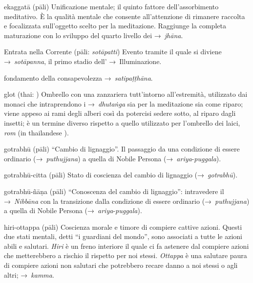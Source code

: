 \begin{glossarydescription}

\item[ekaggatā] (pāli) Unificazione mentale; il quinto fattore dell'assorbimento
  meditativo. È la qualità mentale che consente all'attenzione di rimanere
  raccolta e focalizzata sull'oggetto scelto per la meditazione. Raggiunge la
  completa maturazione con lo sviluppo del quarto livello dei →~\emph{jhāna}.

\item[Entrata nella Corrente] (pāli: \emph{sotāpatti}) Evento tramite il quale
  si diviene →~\emph{sotāpanna}, il primo stadio dell' →~Illuminazione.


\item[fondamento della consapevolezza] →~\emph{satipaṭṭhāna}.


\item[glot] (thai: ) Ombrello con una zanzariera tutt'intorno
  all'estremità, utilizzato dai monaci che intraprendono i →~\emph{dhutaṅga} sia
  per la meditazione sia come riparo; viene appeso ai rami degli alberi così da
  potercisi sedere sotto, al riparo dagli insetti; è un termine diverso rispetto
  a quello utilizzato per l'ombrello dei laici, \emph{rom} (in thailandese
  ).

\item[gotrabhū] (pāli) ``Cambio di lignaggio''. Il passaggio da una condizione
  di essere ordinario (→~\emph{puthujjana}) a quella di Nobile Persona
  (→~\emph{ariya}-\emph{puggala}).

\item[gotrabhū-citta] (pāli) Stato di coscienza del cambio di lignaggio
  (→~\emph{gotrabhū}).

\item[gotrabhū-ñāṇa] (pāli) ``Conoscenza del cambio di lignaggio'': intravedere
  il →~\emph{Nibbāna} con la transizione dalla condizione di essere ordinario
  (→~\emph{puthujjana}) a quella di Nobile Persona
  (→~\emph{ariya}-\emph{puggala}).


\item[hiri-ottappa] (pāli) Coscienza morale e timore di compiere cattive azioni.
  Questi due stati mentali, detti ``i guardiani del mondo'', sono associati a
  tutte le azioni abili e salutari. \emph{Hiri} è un freno interiore il quale ci
  fa astenere dal compiere azioni che metterebbero a rischio il rispetto per noi
  stessi. \emph{Ottappa} è una salutare paura di compiere azioni non salutari
  che potrebbero recare danno a noi stessi o agli altri; →~\emph{kamma}.


\end{glossarydescription}
